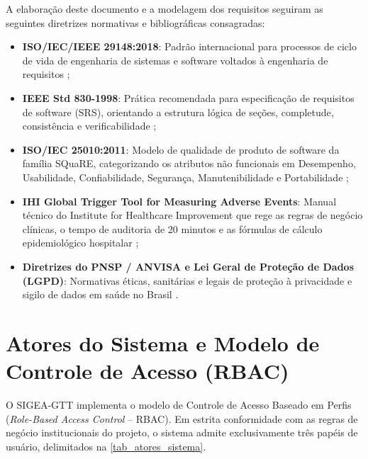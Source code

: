 A elaboração deste documento e a modelagem dos requisitos seguiram as seguintes diretrizes normativas e bibliográficas consagradas:
\begin{itemize}
    \item \textbf{ISO/IEC/IEEE 29148:2018}: Padrão internacional para processos de ciclo de vida de engenharia de sistemas e software voltados à engenharia de requisitos \cite{iso29148};
    \item \textbf{IEEE Std 830-1998}: Prática recomendada para especificação de requisitos de software (SRS), orientando a estrutura lógica de seções, completude, consistência e verificabilidade \cite{ieee830};
    \item \textbf{ISO/IEC 25010:2011}: Modelo de qualidade de produto de software da família SQuaRE, categorizando os atributos não funcionais em Desempenho, Usabilidade, Confiabilidade, Segurança, Manutenibilidade e Portabilidade \cite{iso25010};
    \item \textbf{IHI Global Trigger Tool for Measuring Adverse Events}: Manual técnico do Institute for Healthcare Improvement que rege as regras de negócio clínicas, o tempo de auditoria de 20 minutos e as fórmulas de cálculo epidemiológico hospitalar \cite{griffin2009ihi};
    \item \textbf{Diretrizes do PNSP / ANVISA e Lei Geral de Proteção de Dados (LGPD)}: Normativas éticas, sanitárias e legais de proteção à privacidade e sigilo de dados em saúde no Brasil \cite{anvisa2017,lgpd2018}.
\end{itemize}

\section{Atores do Sistema e Modelo de Controle de Acesso (RBAC)}
\label{sec_atores_rbac}

O SIGEA-GTT implementa o modelo de Controle de Acesso Baseado em Perfis (\textit{Role-Based Access Control} -- RBAC). Em estrita conformidade com as regras de negócio institucionais do projeto, o sistema admite exclusivamente três papéis de usuário, delimitados na \autoref{tab_atores_sistema}.

